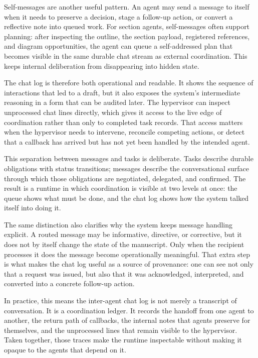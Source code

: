 \documentclass[11pt]{article}
\begin{document}
Self-messages are another useful pattern. An agent may send a message to itself when it needs to preserve a decision, stage a follow-up action, or convert a reflective note into queued work. For section agents, self-messages often support planning: after inspecting the outline, the section payload, registered references, and diagram opportunities, the agent can queue a self-addressed plan that becomes visible in the same durable chat stream as external coordination. This keeps internal deliberation from disappearing into hidden state.

The chat log is therefore both operational and readable. It shows the sequence of interactions that led to a draft, but it also exposes the system's intermediate reasoning in a form that can be audited later. The hypervisor can inspect unprocessed chat lines directly, which gives it access to the live edge of coordination rather than only to completed task records. That access matters when the hypervisor needs to intervene, reconcile competing actions, or detect that a callback has arrived but has not yet been handled by the intended agent.

This separation between messages and tasks is deliberate. Tasks describe durable obligations with status transitions; messages describe the conversational surface through which those obligations are negotiated, delegated, and confirmed. The result is a runtime in which coordination is visible at two levels at once: the queue shows what must be done, and the chat log shows how the system talked itself into doing it.

The same distinction also clarifies why the system keeps message handling explicit. A routed message may be informative, directive, or corrective, but it does not by itself change the state of the manuscript. Only when the recipient processes it does the message become operationally meaningful. That extra step is what makes the chat log useful as a source of provenance: one can see not only that a request was issued, but also that it was acknowledged, interpreted, and converted into a concrete follow-up action.

In practice, this means the inter-agent chat log is not merely a transcript of conversation. It is a coordination ledger. It records the handoff from one agent to another, the return path of callbacks, the internal notes that agents preserve for themselves, and the unprocessed lines that remain visible to the hypervisor. Taken together, those traces make the runtime inspectable without making it opaque to the agents that depend on it.
\end{document}
